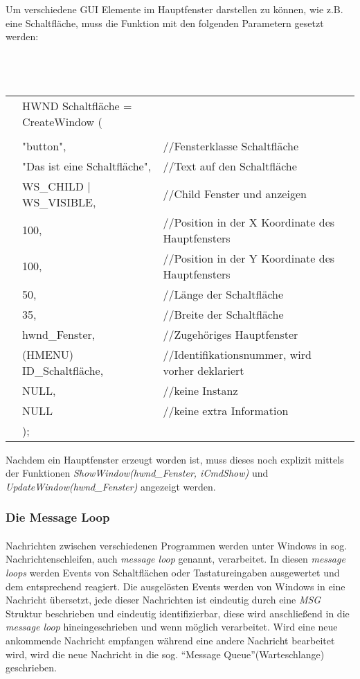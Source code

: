                        
Um verschiedene GUI Elemente im Hauptfenster darstellen zu können, wie z.B. eine Schaltfläche, muss die Funktion mit den folgenden Parametern gesetzt werden:\\\\\\\\

\begin{tabular}{llll}
& HWND Schaltfläche = CreateWindow (\\
\\
& "button",					& //Fensterklasse Schaltfläche\\
& "Das ist eine Schaltfläche",		& //Text auf den Schaltfläche\\
& WS\_CHILD | WS\_VISIBLE,	& //Child Fenster und anzeigen\\
& 100,						& //Position in der X Koordinate des Hauptfensters\\
& 100,						& //Position in der Y Koordinate des Hauptfensters\\
& 50,						& //Länge der Schaltfläche\\
& 35,						& //Breite der Schaltfläche\\
& hwnd\_Fenster,				& //Zugehöriges Hauptfenster\\
& (HMENU) ID\_Schaltfläche,			& //Identifikationsnummer, wird vorher deklariert\\
& NULL,						& //keine Instanz\\
& NULL						& //keine extra Information\\
& );
\end{tabular}

Nachdem ein Hauptfenster erzeugt worden ist, muss dieses noch explizit mittels der Funktionen \textit{ShowWindow(hwnd\_Fenster, iCmdShow)} und \textit{UpdateWindow(hwnd\_Fenster)}	angezeigt werden.

\subsubsection{Die Message Loop}\label{message-loop}
\paragraph{}
Nachrichten zwischen verschiedenen Programmen werden unter Windows in sog. Nachrichtenschleifen, auch \textit{message loop} genannt, verarbeitet. In diesen \textit{message loops}  werden Events von Schaltflächen oder Tastatureingaben ausgewertet und dem entsprechend reagiert. Die ausgelösten Events werden von Windows in eine Nachricht übersetzt, jede dieser Nachrichten ist eindeutig durch eine \textit{MSG} Struktur beschrieben und eindeutig identifizierbar, diese wird anschließend in die \textit{message loop} hineingeschrieben und wenn möglich verarbeitet. Wird eine neue ankommende Nachricht empfangen während eine andere Nachricht bearbeitet wird, wird die neue Nachricht in die sog. "`Message Queue"'(Warteschlange) geschrieben. 

